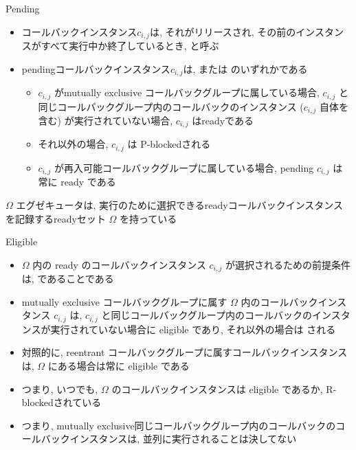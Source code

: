 \begin{frame}{Pending}


    \begin{itemize}
        \item コールバックインスタンス$c_{i, j}$は, それがリリースされ, その前のインスタンスがすべて実行中か終了しているとき,  と呼ぶ
        \item pendingコールバックインスタンス$c_{i, j}$は,  または のいずれかである
              \begin{itemize}
                  \item  $c_{i, j}$ がmutually exclusive コールバックグループに属している場合, $c_{i, j}$ と同じコールバックグループ内のコールバックのインスタンス ($c_{i, j}$ 自体を含む) が実行されていない場合, $c_{i, j}$ はreadyである
                  \item それ以外の場合, $c_{i, j}$ は P-blockedされる

                  \item  $c_{i, j}$ が再入可能コールバックグループに属している場合, pending $c_{i, j}$ は常に ready である
              \end{itemize}
    \end{itemize}
\end{frame}

\begin{frame}{$\Omega$}
    エグゼキュータは, 実行のために選択できるreadyコールバックインスタンスを記録するreadyセット $\Omega$ を持っている
\end{frame}

\begin{frame}{Eligible}
    \begin{itemize}
        \item $\Omega$ 内の ready のコールバックインスタンス $c_{i, j}$ が選択されるための前提条件は,  であることである
        \item mutually exclusive コールバックグループに属す $\Omega$ 内のコールバックインスタンス $c_{i, j}$ は, $c_{i, j}$ と同じコールバックグループ内のコールバックのインスタンスが実行されていない場合に eligible であり, それ以外の場合は  される
        \item 対照的に, reentrant コールバックグループに属すコールバックインスタンスは, $\Omega$ にある場合は常に eligible である
        \item つまり, いつでも, $\Omega$ のコールバックインスタンスは eligible であるか, R-blockedされている
        \item つまり, mutually exclusive同じコールバックグループ内のコールバックのコールバックインスタンスは, 並列に実行されることは決してない
    \end{itemize}
\end{frame}

